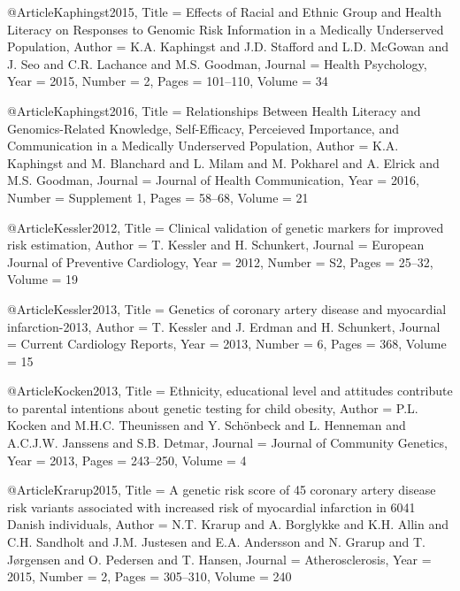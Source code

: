 @Article{Kaphingst2015,
  Title                    = {Effects of Racial and Ethnic Group and Health Literacy on Responses to Genomic Risk Information in a Medically Underserved Population},
  Author                   = {K.A. Kaphingst and J.D. Stafford and L.D. McGowan and J. Seo and C.R. Lachance and M.S. Goodman},
  Journal                  = {Health Psychology},
  Year                     = {2015},
  Number                   = {2},
  Pages                    = {101--110},
  Volume                   = {34}
}

@Article{Kaphingst2016,
  Title                    = {Relationships Between Health Literacy and Genomics-Related Knowledge, Self-Efficacy, Perceieved Importance, and Communication in a Medically Underserved Population},
  Author                   = {K.A. Kaphingst and M. Blanchard and L. Milam and M. Pokharel and A. Elrick and M.S. Goodman},
  Journal                  = {Journal of Health Communication},
  Year                     = {2016},
  Number                   = {Supplement 1},
  Pages                    = {58--68},
  Volume                   = {21}
}

@Article{Kessler2012,
  Title                    = {Clinical validation of genetic markers for improved risk estimation},
  Author                   = {T. Kessler and H. Schunkert},
  Journal                  = {European Journal of Preventive Cardiology},
  Year                     = {2012},
  Number                   = {S2},
  Pages                    = {25--32},
  Volume                   = {19}
}

@Article{Kessler2013,
  Title                    = {Genetics of coronary artery disease and myocardial infarction-2013},
  Author                   = {T. Kessler and J. Erdman and H. Schunkert},
  Journal                  = {Current Cardiology Reports},
  Year                     = {2013},
  Number                   = {6},
  Pages                    = {368},
  Volume                   = {15}
}

@Article{Kocken2013,
  Title                    = {Ethnicity, educational level and attitudes contribute to parental intentions about genetic testing for child obesity},
  Author                   = {P.L. Kocken and M.H.C. Theunissen and Y. Schönbeck and L. Henneman and A.C.J.W. Janssens and S.B. Detmar},
  Journal                  = {Journal of Community Genetics},
  Year                     = {2013},
  Pages                    = {243--250},
  Volume                   = {4}
}

@Article{Krarup2015,
  Title                    = {A genetic risk score of 45 coronary artery disease risk variants associated with increased risk of myocardial infarction in 6041 Danish individuals},
  Author                   = {N.T. Krarup and A. Borglykke and K.H. Allin and C.H. Sandholt and J.M. Justesen and E.A. Andersson and N. Grarup and T. Jørgensen and O. Pedersen and T. Hansen},
  Journal                  = {Atherosclerosis},
  Year                     = {2015},
  Number                   = {2},
  Pages                    = {305--310},
  Volume                   = {240}
}

